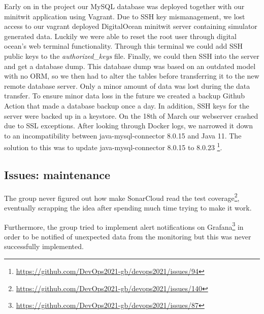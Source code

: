 Early on in the project our MySQL database was deployed together with our minitwit application using Vagrant. Due to SSH key mismanagement, we lost access to our vagrant deployed DigitalOcean minitwit server containing simulator generated data. Luckily we were able to reset the root user through digital ocean's web terminal functionality. Through this terminal we could add SSH public keys to the \textit{authorized\_keys} file. Finally, we could then SSH into the server and get a database dump. This database dump was based on an outdated model with no ORM, so we then had to alter the tables before transferring it to the new remote database server. Only a minor amount of data was lost during the data transfer. To ensure minor data loss in the future we created a backup Github Action that made a database backup once a day. In addition, SSH keys for the server were backed up in a keystore.
On the 18th of March our webserver crashed due to SSL exceptions. After looking through Docker logs, we narrowed it down to an incompatibility between java-mysql-connector 8.0.15 and Java 11. The solution to this was to update java-mysql-connector 8.0.15 to 8.0.23 \footnote{\url{https://github.com/DevOps2021-gb/devops2021/issues/94}}.

\subsection{Issues: maintenance}
The group never figured out how make SonarCloud read the test coverage\footnote{\url{https://github.com/DevOps2021-gb/devops2021/issues/140}}, eventually scrapping the idea after spending much time trying to make it work.

Furthermore, the group tried to implement alert notifications on Grafana\footnote{\url{https://github.com/DevOps2021-gb/devops2021/issues/87}} in order to be notified of unexpected data from the monitoring but this was never successfully implemented.